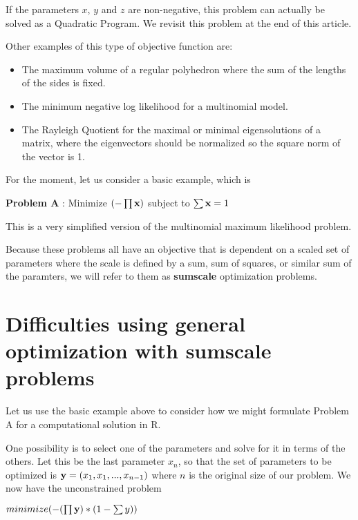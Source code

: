 \documentclass[11pt]{article}\usepackage[]{graphicx}\usepackage[]{color}
\newcommand{\B}[1]{{\bf #1 \rm}}
\newcommand{\R}{{\sf R}}
\begin{document}
If the parameters $x$, $y$ and $z$ are non-negative, this problem can actually 
be solved as a Quadratic Program. We revisit this problem at the end of this
article.

Other examples of this type of objective function are:

\begin{itemize}
\item{The maximum volume  of a regular polyhedron where the sum of the lengths
of the sides is fixed.}
\item{The minimum negative log likelihood for a multinomial model.}
\item{The Rayleigh Quotient for the maximal or minimal eigensolutions of a matrix, where
the eigenvectors should be normalized so the square norm of the vector is 1.}
\end{itemize}

For the moment, let us consider a basic example, which is 
\vspace*{10pt}

\B{Problem A}: Minimize  $( - \prod{\B{x}})$ subject to $\sum{\B{x}}=1$
\vspace*{10pt}

This is a very simplified version of the multinomial maximum likelihood problem. 

Because these problems all have an objective that is dependent on a scaled set of parameters 
where the scale is defined by a sum, sum of squares, or similar sum of the paramters, we will
refer to them as \B{sumscale} optimization problems.

\section{Difficulties using general optimization with sumscale problems}

Let us use the basic example above to consider how we might formulate Problem A for a
computational solution in \R. 

One possibility is to select one of the parameters and solve for it in 
terms of the others. Let this
be the last parameter $x_n$, so that the set of parameters to be 
optimized is $ \B{y} = (x_1, x_1, ..., x_{n-1})$ where 
$n$ is the original size of our problem. We now have the unconstrained problem
\vspace*{10pt}

$ minimize ( - (\prod{\B{y}}) * (1 - \sum{y} ) ) $
\end{document}
